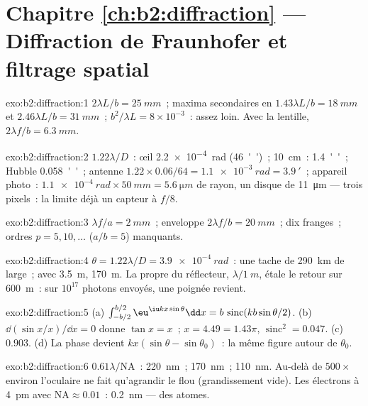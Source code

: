 \section*{Chapitre \ref{ch:b2:diffraction} --- Diffraction de Fraunhofer et filtrage spatial}

\begin{solution}{exo:b2:diffraction:1}
$2\lambda L/b = \qty{25}{mm}$~; maxima secondaires en $1.43\lambda L/b = \qty{18}{mm}$ et
$2.46\lambda L/b = \qty{31}{mm}$~;  $b^2/\lambda L = 8 \times 10^{-3}$~: assez
loin. Avec la lentille, $2\lambda f/b = \qty{6.3}{mm}$.
\end{solution}

\begin{solution}{exo:b2:diffraction:2}
$1.22\lambda/D$~: œil \qty{2.2e-4}{rad} (\qty{46}{''})~; \qty{10}{cm}~: \qty{1.4}{''}~; Hubble
\qty{0.058}{''}~; antenne $1.22 \times 0.06/64 = \qty{1.1e-3}{rad} = \qty{3.9}{'}$~; appareil photo~:
$\qty{1.1e-4}{rad} \times \qty{50}{mm} = \qty{5.6}{\micro m}$ de rayon, un disque de \qty{11}{\micro m} ---
trois pixels~: la  limite déjà un capteur à $f/8$.
\end{solution}

\begin{solution}{exo:b2:diffraction:3}
$\lambda f/a = \qty{2}{mm}$~; enveloppe $2\lambda f/b = \qty{20}{mm}$~; dix franges~; ordres
$p = 5, 10, \dots$ ($a/b = 5$) manquants.
\end{solution}

\begin{solution}{exo:b2:diffraction:4}
$\theta = 1.22\lambda/D = \qty{3.9e-4}{rad}$~: une tache de \qty{290}{km} de large~; avec \qty{3.5}{m},
\qty{170}{m}. La  propre du réflecteur, $\lambda/\qty{1}{m}$, étale le
retour sur \qty{600}{m}~: sur $10^{17}$ photons envoyés, une poignée revient.
\end{solution}

\begin{solution}{exo:b2:diffraction:5}
(a) $\int_{-b/2}^{b/2}\eu^{\iu kx\sin\theta}\dd x = b\,\operatorname{sinc}(kb\sin\theta/2)$. (b)
$\dd(\sin x/x)/\dd x = 0$ donne $\tan x = x$~; $x = 4.49 = 1.43\pi$, $\operatorname{sinc}^2 =
0.047$. (c) $0.903$. (d) La phase devient $kx(\sin\theta - \sin\theta_0)$~: la
même figure autour de $\theta_0$.
\end{solution}

\begin{solution}{exo:b2:diffraction:6}
$0.61\lambda/\mathrm{NA}$~: \qty{220}{nm}~; \qty{170}{nm}~; \qty{110}{nm}. Au-delà de $500\times$ environ
l'oculaire ne fait qu'agrandir le flou (grandissement vide). Les électrons
à \qty{4}{pm} avec $\mathrm{NA} \approx 0.01$~: \qty{0.2}{nm} --- des atomes.
\end{solution}

